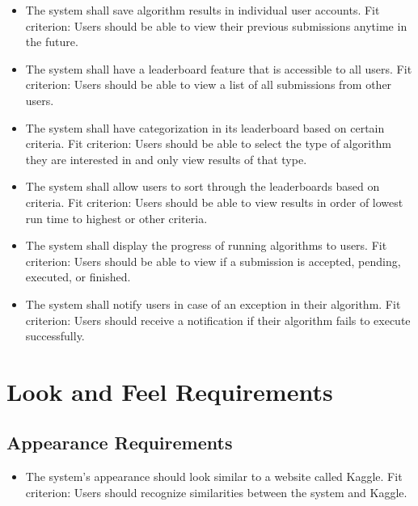 \documentclass[12pt]{article}
\begin{document}
\begin{itemize}
    \item The system shall save algorithm results in individual user accounts. \hfill \break
    Fit criterion: Users should be able to view their previous submissions anytime in the future.
\end{itemize}
\begin{itemize}
    \item The system shall have a leaderboard feature that is accessible to all users. \hfill \break
    Fit criterion: Users should be able to view a list of all submissions from other users.
\end{itemize}
\begin{itemize}
    \item The system shall have categorization in its leaderboard based on certain criteria. \hfill \break
    Fit criterion: Users should be able to select the type of algorithm they are interested in and only view results of that type.
\end{itemize}
\begin{itemize}
    \item The system shall allow users to sort through the leaderboards based on criteria. \hfill \break
    Fit criterion: Users should be able to view results in order of lowest run time to highest or other criteria.
\end{itemize}
\begin{itemize}
    \item The system shall display the progress of running algorithms to users. \hfill \break
    Fit criterion: Users should be able to view if a submission is accepted, pending, executed, or finished.
\end{itemize}
\begin{itemize}
    \item The system shall notify users in case of an exception in their algorithm. \hfill \break
    Fit criterion: Users should receive a notification if their algorithm fails to execute successfully.
\end{itemize}

\section{Look and Feel Requirements}
\subsection{Appearance Requirements}
\begin{itemize}
    \item The system’s appearance should look similar to a website called Kaggle. \hfill \break
    Fit criterion: Users should recognize similarities between the system and Kaggle.
\end{itemize}
\end{document}
